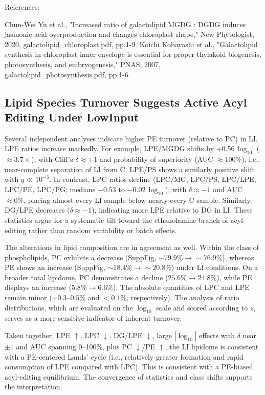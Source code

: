 \documentclass[10pt,letterpaper]{article}
\begin{document}
References:

Chun-Wei Yu et al., "Increased ratio of galactolipid MGDG : DGDG induces jasmonic acid overproduction and changes chloroplast shape," New Phytologist, 2020, galactolipid\_chloroplast.pdf, pp.1-9.
Koichi Kobayashi et al., "Galactolipid synthesis in chloroplast inner envelope is essential for proper thylakoid biogenesis, photosynthesis, and embryogenesis," PNAS, 2007, galactolipid\_photosynthesis.pdf, pp.1-6.


\subsection*{Lipid Species Turnover Suggests Active Acyl Editing Under LowInput}

Several independent analyses indicate higher PE turnover (relative to PC) in LI. LPE ratios increase markedly. For example, LPE/MGDG shifts by  $+0.56 \,\log_{10}$ ($\approx 3.7\times$), with Cliff’s $\delta \approx +1$ and probability of superiority (AUC $\approx 100\%$), i.e., near-complete separation of LI from C. LPE/PS shows a similarly positive shift with $q \ll 10^{-3}$. In contrast, LPC ratios decline (LPC/MG, LPC/PS, LPC/LPE, LPC/PE, LPC/PG; medians $-0.53$ to $-0.02 \,\log_{10}$), with 
$\delta \approx -1$ and AUC $\approx 0\%$, placing almost every LI sample below nearly every C sample. 
Similarly, DG/LPE decreases ($\delta \approx -1$), indicating more LPE relative to DG in LI. 
These statistics argue for a systematic tilt toward the ethanolamine branch of acyl-editing 
rather than random variability or batch effects.

The alterations in lipid composition are in agreement as well. Within the class of phospholipids, PC exhibits a decrease (SuppFig, $\sim 79.9\% \rightarrow \sim 76.9\%$), whereas PE shows an increase (SuppFig, $\sim 18.4\% \rightarrow \sim 20.8\%$) under LI conditions. On a broader total lipidome, PC demonstrates a decline ($25.6\% \rightarrow 24.8\%$), while PE displays an increase ($5.8\% \rightarrow 6.6\%$). The absolute quantities of LPC and LPE remain minor ($\sim 0.3$–$0.5\%$ and $<0.1\%$, respectively). The analysis of ratio distributions, which are evaluated on the $\log_{10}$ scale and scored according to $z$, serves as a more sensitive indicator of inherent turnover.

Taken together, LPE $\uparrow$, LPC $\downarrow$, DG/LPE $\downarrow$, large $|\log_{10}|$ effects with 
$\delta$ near $\pm 1$ and AUC spanning 0–100\%, plus PC $\downarrow$/PE $\uparrow$, the LI lipidome is 
consistent with a PE-centered Lands’ cycle (i.e., relatively greater formation and rapid consumption 
of LPE compared with LPC). This is consistent with a PE-biased acyl-editing equilibrium. The convergence of statistics and class shifts supports the interpretation.
\end{document}

